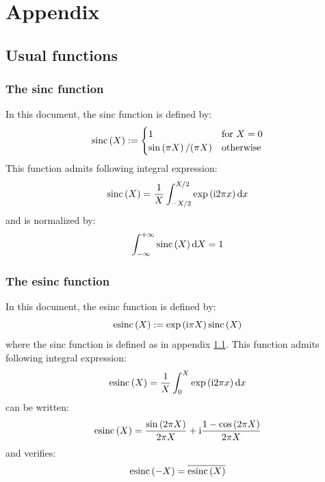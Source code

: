 \documentclass[10pt,a4paper,twoside,openany]{book}
\begin{document}
\part{Appendix}

\chapter{Usual functions}

\section{The sinc function}
\label{sinc}

In this document, the sinc function is defined by:
\begin{equation*}
\mathrm{sinc} \left( {X} \right) := \begin{cases}
1 & \text{for $X = 0$} \\
\mathrm{sin} \left( {\pi X} \right) / ( \pi X ) & \text{otherwise}
\end{cases}
\end{equation*}
This function admits following integral expression:
\begin{equation*}
\mathrm{sinc} \left( {X} \right) = \frac 1 X \int_{-X/2}^{X/2} \mathrm{exp} \left( {\mathrm{i} 2 \pi x} \right) \mathrm dx
\end{equation*}
and is normalized by:
\begin{equation*}
\int_{-\infty}^{+\infty} \mathrm{sinc} \left( {X} \right) \mathrm dX = 1
\end{equation*}

\section{The esinc function}
\label{esinc}

In this document, the esinc function is defined by:
\begin{equation*}
\mathrm{esinc} \left( {X} \right) := \mathrm{exp} \left( {\mathrm{i} \pi X} \right) \mathrm{sinc} \left( {X} \right)
\end{equation*}
where the sinc function is defined as in appendix \ref{sinc}. This function admits following integral expression:
\begin{equation*}
\mathrm{esinc} \left( {X} \right) = \frac 1 X \int_0^X \mathrm{exp} \left( {\mathrm{i} 2 \pi x} \right) \mathrm dx
\end{equation*}
can be written:
\begin{equation*}
\mathrm{esinc} \left( {X} \right) = \frac{\mathrm{sin} \left( {2 \pi X} \right)}{2 \pi X} + \mathrm{i} \frac{1 - \mathrm{cos} \left( {2 \pi X} \right)}{2 \pi X}
\end{equation*}
and verifies:
\begin{equation*}
\mathrm{esinc} \left( {-X} \right) = \overline{\mathrm{esinc} \left( {X} \right)}
\end{equation*}
\end{document}
